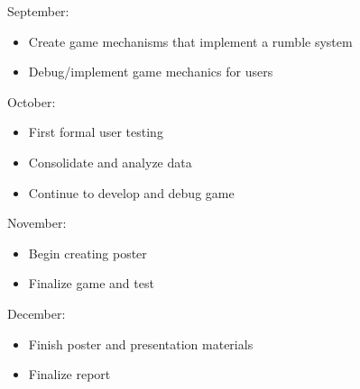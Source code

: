 \documentclass[10pt,twocolumn]{article}
\begin{document}
September:
\begin{itemize}
\item Create game mechanisms that implement a rumble system
\item Debug/implement game mechanics for users
\end{itemize}

October:
\begin{itemize}
\item First formal user testing
\item Consolidate and analyze data
\item Continue to develop and debug game
\end{itemize}

November:
\begin{itemize}
\item Begin creating poster
\item Finalize game and test
\end{itemize}

December:
\begin{itemize}
\item Finish poster and presentation materials
\item Finalize report
\end{itemize}


\appendix

\printbibliography
\end{document}
